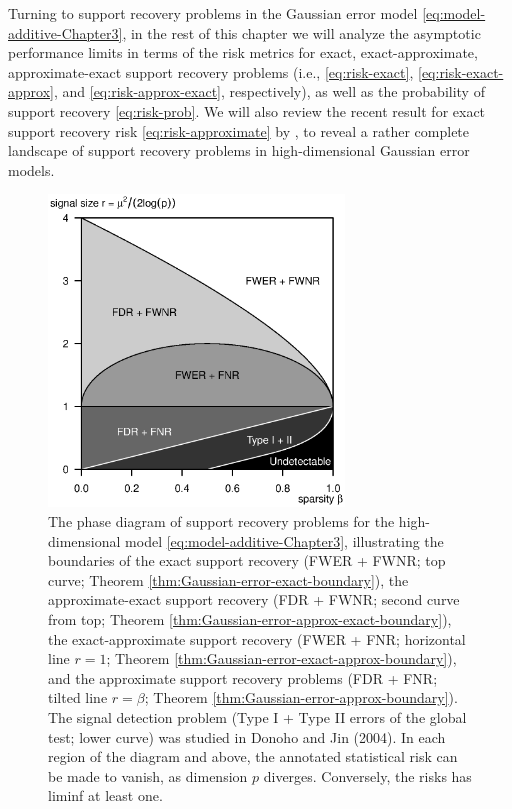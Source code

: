 



Turning to support recovery problems in the Gaussian error model \eqref{eq:model-additive-Chapter3}, in the rest of this chapter
we will analyze the asymptotic performance limits in terms of the risk metrics for exact, exact-approximate, approximate-exact support recovery problems (i.e., \eqref{eq:risk-exact}, \eqref{eq:risk-exact-approx}, and \eqref{eq:risk-approx-exact}, respectively), as well as the probability of support recovery
\eqref{eq:risk-prob}.  We will also review the recent result for exact support recovery risk \eqref{eq:risk-approximate} by \cite{arias2017distribution}, to 
reveal a rather complete landscape of support recovery problems in high-dimensional Gaussian error models.


\begin{figure}
  \begin{center}
    \includegraphics[width=0.7\textwidth]{./figures/phase_diagram_Gaussian_ALL_boundaries.eps}
  \end{center}
   \caption{The phase diagram of support recovery problems for the high-dimensional model \eqref{eq:model-additive-Chapter3}, illustrating the boundaries of the exact support recovery (FWER + FWNR; top curve; Theorem \ref{thm:Gaussian-error-exact-boundary}), the approximate-exact support recovery (FDR + FWNR; second curve from top; Theorem \ref{thm:Gaussian-error-approx-exact-boundary}), the exact-approximate support recovery (FWER + FNR; horizontal line $r=1$; Theorem \ref{thm:Gaussian-error-exact-approx-boundary}), and the approximate support recovery problems (FDR + FNR; tilted line $r=\beta$; Theorem \ref{thm:Gaussian-error-approx-boundary}). The signal detection problem (Type I + Type II errors of the global test; lower curve) was studied in Donoho and Jin (2004). In each region of the diagram and above, the annotated statistical risk can be made to vanish, as dimension $p$ diverges. Conversely, the risks has liminf at least one.}
   \label{fig:phase-Gaussian-errors}
\end{figure}

